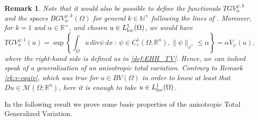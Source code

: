 \documentclass[a4paper,11pt,oneside,notitlepage]{article}
\newtheorem{remark}[theorem]{Remark}
\numberwithin{equation}{section}
\def\R{\mathbb{R}}
\def\N{\mathbb{N}}
\def\M{\mathcal{M}}
\def\loc{{\rm loc}}
\renewcommand{\div}{\mathrm{div}}
\newcommand{\vphi}{\varphi}
\newcommand{\st}{ \ : \ }
\begin{document}
\begin{remark}
    Note that it would also be possible to define the functionals $TGV^{\vphi,k}_\alpha$ and the spaces $BGV^{\vphi,k}_\alpha(\Omega)$ for general $k \in \N^+$ following the lines of \cite{BKP10}. Moreover, for $k = 1$ and $\alpha \in \R^+$, and chosen $u \in L^1_\loc(\Omega)$, we would have
    \begin{equation*}
        TGV^{\vphi,1}_\alpha(u) = \sup \left\{\int_\Omega u \, \div \psi \, dx \st \psi \in C^1_c (\Omega; \R^n), \|\psi\|_{\vphi^*} \le \alpha \right\} = \alpha V_\vphi(u),
    \end{equation*}
    where the right-hand side is defined as in \eqref{def:EHH_TV}. Hence, we can indeed speak of a generalization of an anisotropic total variation.  Contrary to Remark \ref{rk:v-equiv}, which was true for $u \in BV(\Omega)$ in order to know at least that $Du \in \M(\Omega;\R^n)$, here it is enough to take $u \in L^1_{\loc}(\Omega)$.
\end{remark}

In the following result we prove some basic properties of the anisotropic Total Generalized Variation.
\end{document}
